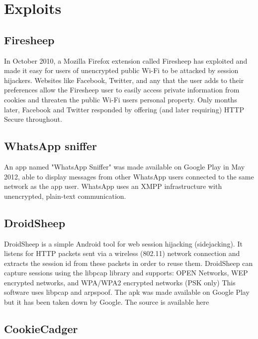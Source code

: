 \section{Exploits}




\subsection{Firesheep}


In October 2010, a Mozilla Firefox extension called Firesheep has exploited and made it easy for users of unencrypted public Wi-Fi to be attacked by session hijackers. Websites like Facebook, Twitter, and any that the user adds to their preferences allow the Firesheep user to easily access private information from cookies and threaten the public Wi-Fi users personal property. Only months later, Facebook and Twitter responded by offering (and later requiring) HTTP Secure throughout.






\subsection{WhatsApp sniffer}

An app named "WhatsApp Sniffer" was made available on Google Play in May 2012, able to display messages from other WhatsApp users connected to the same network as the app user. WhatsApp uses an XMPP infrastructure with unencrypted, plain-text communication.





\subsection{DroidSheep}

DroidSheep is a simple Android tool for web session hijacking (sidejacking). It listens for HTTP packets sent via a wireless (802.11) network connection and extracts the session id from these packets in order to reuse them. DroidSheep can capture sessions using the libpcap library and supports: OPEN Networks, WEP encrypted networks, and WPA/WPA2 encrypted networks (PSK only) This software uses libpcap and arpspoof. The apk was made available on Google Play but it has been taken down by Google. The source is available here





\subsection{CookieCadger}


